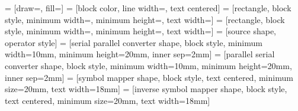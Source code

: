 %



%
%
%
   = [draw=\blockdrawcolor,
      fill=\blockfillcolor]
%
   = [block color,
      line width=\blocklinewidth,
      text centered]
%
   = [rectangle,
      block style,
      minimum width=\blockwidth,
      minimum height=\blockheight,
      text width=\blocktextwidth]
%
   = [rectangle,
      block style,
      minimum width=\filterwidth,
      minimum height=\filterheight,
      text width=\filtertextwidth]
%
   = [source shape,
      operator style]
%
   = [serial parallel converter shape,
      block style,
      minimum width=10mm,
      minimum height=20mm,
      inner sep=2mm]
%
   = [parallel serial converter shape,
      block style,
      minimum width=10mm,
      minimum height=20mm,
      inner sep=2mm]
%
   = [symbol mapper shape,
      block style,
      text centered,
      minimum size=20mm,
      text width=18mm]
%
   = [inverse symbol mapper shape,
      block style,
      text centered,
      minimum size=20mm,
      text width=18mm]
  



